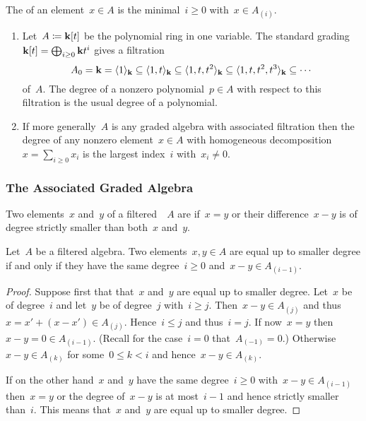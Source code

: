 \begin{definition}
  The  of an element~$x \in A$ is the minimal~$i \geq 0$ with~$x \in A_{(i)}$.
\end{definition}


\begin{example}
  \leavevmode
  \begin{enumerate}
    \item
      Let~$A \coloneqq \mathbf{k}[t]$ be the polynomial ring in one variable.
      The standard grading~$\mathbf{k}[t] = \bigoplus_{i \geq 0} \mathbf{k} t^i$ gives a filtration
      \[
        A_0
        =
        \mathbf{k}
        =
        \langle 1 \rangle_{\mathbf{k}}
        \subseteq
        \langle 1, t \rangle_{\mathbf{k}}
        \subseteq
        \langle 1, t, t^2 \rangle_{\mathbf{k}}
        \subseteq
        \langle 1, t, t^2, t^3 \rangle_{\mathbf{k}}
        \subseteq
        \dotsb
      \]
      of~$A$.
      The degree of a nonzero polynomial~$p \in A$ with respect to this filtration is the usual degree of a polynomial.
    \item
      If more generally~$A$ is any graded algebra with associated filtration then the degree of any nonzero element~$x \in A$ with homogeneous decomposition~$x = \sum_{i \geq 0} x_i$ is the largest index~$i$ with~$x_i \neq 0$.
  \end{enumerate}
\end{example}


\subsubsection{The Associated Graded Algebra}


\begin{definition}
  Two elements~$x$ and~$y$ of a filtered~{\algebra{$\kf$}}~$A$ are  if~$x = y$ or their difference~$x - y$ is of degree strictly smaller than both~$x$ and~$y$.
\end{definition}


\begin{lemma}
  Let~$A$ be a filtered algebra.
  Two elements~$x, y \in A$ are equal up to smaller degree if and only if they have the same degree~$i \geq 0$ and~$x - y \in A_{(i-1)}$.
\end{lemma}


\begin{proof}
  Suppose first that that~$x$ and~$y$ are equal up to smaller degree.
  Let~$x$ be of degree~$i$ and let~$y$ be of degree~$j$ with~$i \geq j$.
  Then~$x - y \in A_{(j)}$ and thus~$x = x' + (x- x') \in A_{(j)}$.
  Hence~$i \leq j$ and thus~$i = j$.  
  If now~$x = y$ then~$x - y = 0 \in A_{(i-1)}$.
  (Recall for the case~$i = 0$ that~$A_{(-1)} = 0$.)
  Otherwise~$x - y \in A_{(k)}$ for some~$0 \leq k < i$ and hence~$x - y \in A_{(k)}$.
  
  If on the other hand~$x$ and~$y$ have the same degree~$i \geq 0$ with~$x - y \in A_{(i-1)}$ then~$x = y$ or the degree of~$x - y$ is at most~$i-1$ and hence strictly smaller than~$i$.
  This means that~$x$ and~$y$ are equal up to smaller degree.
\end{proof}


